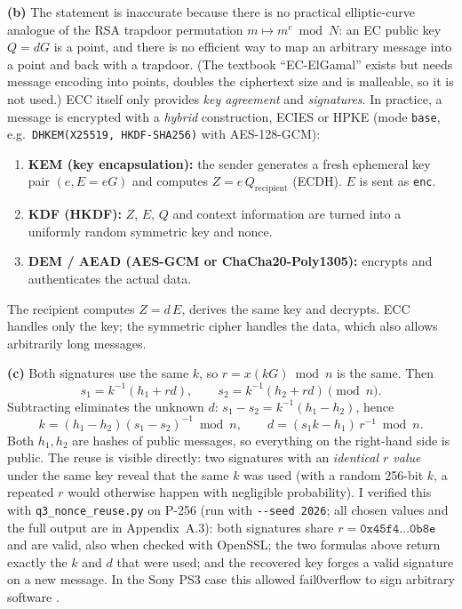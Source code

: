 \documentclass[11pt,a4paper]{article}
\begin{document}
\textbf{(b)} The statement is inaccurate because there is no practical elliptic-curve analogue
of the RSA trapdoor permutation $m \mapsto m^e \bmod N$: an EC public key $Q=dG$ is a point,
and there is no efficient way to map an arbitrary message into a point and back with a trapdoor.
(The textbook ``EC-ElGamal'' exists but needs message encoding into points, doubles the ciphertext
size and is malleable, so it is not used.) ECC itself only provides \emph{key agreement} and
\emph{signatures}. In practice, a message is encrypted with a \emph{hybrid} construction, ECIES
or HPKE \cite{rfc9180} (mode \texttt{base}, e.g.\ \texttt{DHKEM(X25519, HKDF-SHA256)} with AES-128-GCM):
\begin{enumerate}
\item \textbf{KEM (key encapsulation):} the sender generates a fresh ephemeral key pair $(e, E=eG)$
and computes $Z = e\,Q_{\text{recipient}}$ (ECDH). $E$ is sent as \texttt{enc}.
\item \textbf{KDF (HKDF):} $Z$, $E$, $Q$ and context information are turned into a uniformly random
symmetric key and nonce.
\item \textbf{DEM / AEAD (AES-GCM or ChaCha20-Poly1305):} encrypts and authenticates the actual data.
\end{enumerate}
The recipient computes $Z = d\,E$, derives the same key and decrypts. ECC handles only the key; the
symmetric cipher handles the data, which also allows arbitrarily long messages.

\textbf{(c)} Both signatures use the same $k$, so $r = x(kG) \bmod n$ is the same. Then
\[
s_1 = k^{-1}(h_1 + r d), \qquad s_2 = k^{-1}(h_2 + r d) \pmod n .
\]
Subtracting eliminates the unknown $d$: $s_1 - s_2 = k^{-1}(h_1 - h_2)$, hence
\[
\boxed{k = (h_1 - h_2)(s_1 - s_2)^{-1} \bmod n}, \qquad
\boxed{d = (s_1 k - h_1)\, r^{-1} \bmod n}.
\]
Both $h_1, h_2$ are hashes of public messages, so everything on the right-hand side is public. The
reuse is visible directly: two signatures with an \emph{identical $r$ value} under the same key
reveal that the same $k$ was used (with a random 256-bit $k$, a repeated $r$ would otherwise happen with
negligible probability). I verified this with \texttt{q3\_nonce\_reuse.py} on P-256 (run with \texttt{-{}-seed 2026}; all chosen
values and the full output are in Appendix~A.3): both signatures share $r = \texttt{0x45f4\ldots 0b8e}$ and are valid,
also when checked with OpenSSL; the two formulas above return exactly the $k$ and $d$ that were used; and the
recovered key forges a valid signature on a new message. In the Sony PS3 case this allowed fail0verflow to sign arbitrary software \cite{ps3}.
\end{document}
